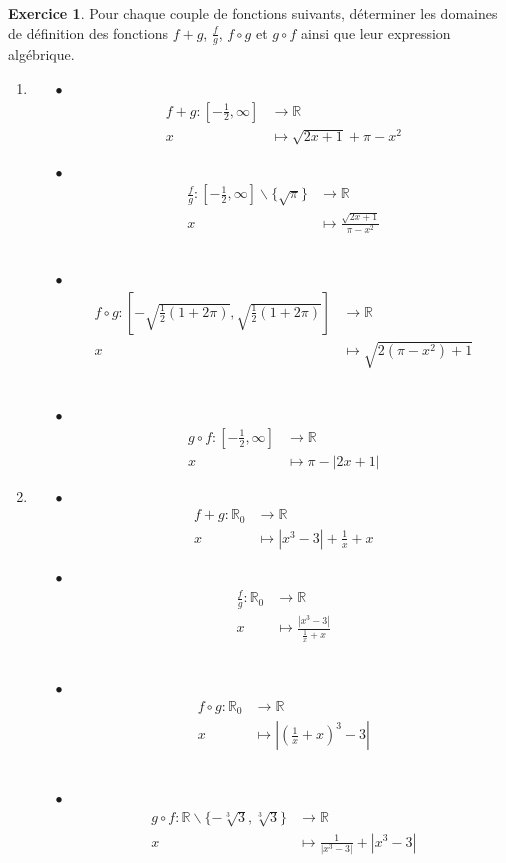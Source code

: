 \documentclass[a4paper,13pt]{scrreprt}
\theoremstyle{plain}
\theoremstyle{definition}
\newtheorem{exo}[subsection]{Exercice}
\newcommand{\rr}{\mathbb{R}}
\begin{document}
\begin{exo}
	Pour chaque couple de fonctions suivants, déterminer les domaines de définition des fonctions $f+g$, $\frac{f}{g}$, $f \circ g$ et $g\circ f$ ainsi que leur expression algébrique.
	\begin{enumerate}
		\item \begin{itemize}
			\item [$\bullet$] \begin{align*}
			f + g : [-\frac{1}{2},\infty] &\to \rr \\
			x &\mapsto \sqrt{2x+1} + \pi - x^2
			\end{align*}
			\item [$\bullet$] \begin{align*}
			\frac{f}{g} : [-\frac{1}{2},\infty] \backslash \{\sqrt{\pi}\} &\to \rr \\
			x &\mapsto \frac{\sqrt{2x+1}}{\pi - x^2}
			\end{align*} \\
			\item [$\bullet$] \begin{align*}
			f \circ g : [-\sqrt{\frac{1}{2}(1+2\pi)}, \sqrt{\frac{1}{2}(1+2\pi)}] &\to \rr \\
			x &\mapsto \sqrt{2(\pi - x^2)+1}
			\end{align*} \\
			\item [$\bullet$] \begin{align*}
			g \circ f : [-\frac{1}{2},\infty] &\to \rr \\
			x &\mapsto \pi - |2x+1|
			\end{align*}
		\end{itemize}
		
		\item \begin{itemize}
			\item [$\bullet$] \begin{align*}
			f + g : {\rr}_{0} &\to \rr \\
			x &\mapsto |x^3-3| + \frac{1}{x}+x
			\end{align*}
			\item [$\bullet$] \begin{align*}
			\frac{f}{g} : {\rr}_{0} &\to \rr \\
			x &\mapsto \frac{|x^3-3|}{\frac{1}{x}+x}
			\end{align*} \\
			\item [$\bullet$] \begin{align*}
			f \circ g : {\rr}_{0} &\to \rr \\
			x &\mapsto |(\frac{1}{x}+x)^3-3|
			\end{align*} \\
			\item [$\bullet$] \begin{align*}
			g \circ f : {\rr} \backslash \{-\sqrt[3]{3},\sqrt[3]{3}\} &\to \rr \\
			x &\mapsto \frac{1}{|x^3-3|}+|x^3-3|
			\end{align*}
		\end{itemize}


\end{enumerate}
\end{exo}
\end{document}
